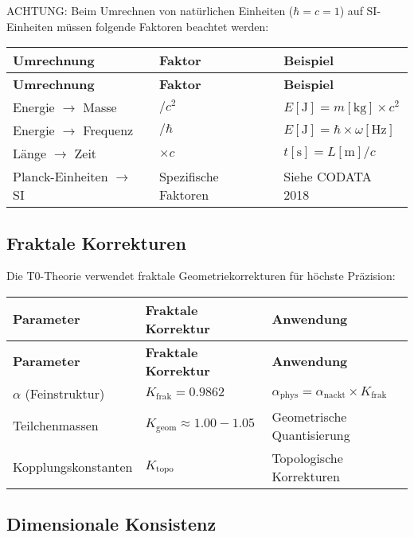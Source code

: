 \documentclass[12pt,a4paper]{article}
\begin{document}
	ACHTUNG: Beim Umrechnen von natürlichen Einheiten (\(\hbar = c = 1\)) auf SI-Einheiten müssen folgende Faktoren beachtet werden:
	
	\begin{longtable}{|p{3cm}|p{3cm}|p{6cm}|}
		\hline
		\textbf{Umrechnung} & \textbf{Faktor} & \textbf{Beispiel} \\
		\hline
		\endfirsthead
		\hline
		\textbf{Umrechnung} & \textbf{Faktor} & \textbf{Beispiel} \\
		\hline
		\endhead
		Energie \(\rightarrow\) Masse & \(/c^{2}\) & \(E[\text{J}] = m[\text{kg}] \times c^{2}\) \\
		\hline
		Energie \(\rightarrow\) Frequenz & \(/\hbar\) & \(E[\text{J}] = \hbar \times \omega[\text{Hz}]\) \\
		\hline
		Länge \(\rightarrow\) Zeit & \(\times c\) & \(t[\text{s}] = L[\text{m}]/c\) \\
		\hline
		Planck-Einheiten \(\rightarrow\) SI & Spezifische Faktoren & Siehe CODATA 2018 \\
		\hline
	\end{longtable}
	
	\subsection{Fraktale Korrekturen}
	
	Die T0-Theorie verwendet fraktale Geometriekorrekturen für höchste Präzision:
	
	\begin{longtable}{|p{4cm}|p{4cm}|p{5cm}|}
		\hline
		\textbf{Parameter} & \textbf{Fraktale Korrektur} & \textbf{Anwendung} \\
		\hline
		\endfirsthead
		\hline
		\textbf{Parameter} & \textbf{Fraktale Korrektur} & \textbf{Anwendung} \\
		\hline
		\endhead
		\(\alpha\) (Feinstruktur) & \(K_{\text{frak}} = 0.9862\) & \(\alpha_{\text{phys}} = \alpha_{\text{nackt}} \times K_{\text{frak}}\) \\
		\hline
		Teilchenmassen & \(K_{\text{geom}} \approx 1.00-1.05\) & Geometrische Quantisierung \\
		\hline
		Kopplungskonstanten & \(K_{\text{topo}}\) & Topologische Korrekturen \\
		\hline
	\end{longtable}
	
	\subsection{Dimensionale Konsistenz}
	
\end{document}
